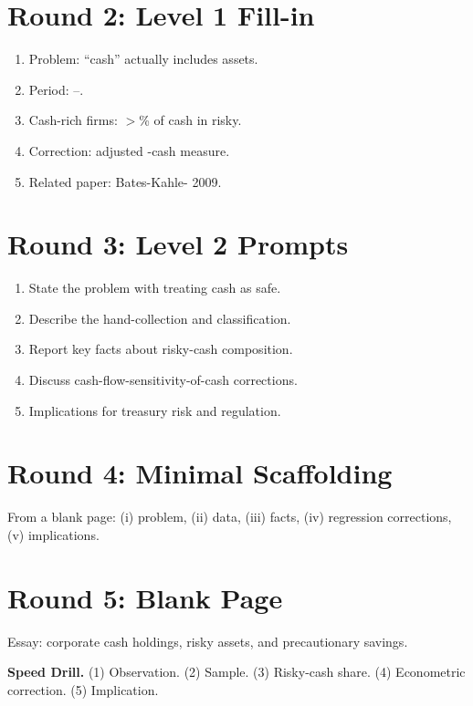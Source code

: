 \documentclass[11pt]{article}
\newcommand{\blank}[1]{\underline{\hspace{#1}}}
\begin{document}
\section*{Round 2: Level 1 Fill-in}
\begin{enumerate}
\item Problem: ``cash'' actually includes \blank{2cm} assets.
\item Period: \blank{1cm}--\blank{1cm}.
\item Cash-rich firms: $>$\blank{1cm}\% of cash in risky.
\item Correction: adjusted \blank{2cm}-cash measure.
\item Related paper: Bates-Kahle-\blank{2cm} 2009.
\end{enumerate}

\section*{Round 3: Level 2 Prompts}
\begin{enumerate}
\item State the problem with treating cash as safe.
\item Describe the hand-collection and classification.
\item Report key facts about risky-cash composition.
\item Discuss cash-flow-sensitivity-of-cash corrections.
\item Implications for treasury risk and regulation.
\end{enumerate}

\section*{Round 4: Minimal Scaffolding}
From a blank page: (i) problem, (ii) data, (iii) facts, (iv) regression corrections, (v) implications.

\section*{Round 5: Blank Page}
Essay: corporate cash holdings, risky assets, and precautionary savings.

\vspace{6pt}
\begin{drillbox}
\textbf{Speed Drill.} (1) Observation. (2) Sample. (3) Risky-cash share. (4) Econometric correction. (5) Implication.
\end{drillbox}
\end{document}
